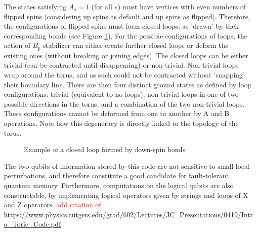 The states satisfying $A_s=1$ (for all $s$) must have vertices with even numbers of flipped spins (considering up spins as default and up spins as flipped). Therefore, the configurations of flipped spins must form closed loops, as 'drawn' by their corresponding bonds (see Figure \ref{fig:toric_code_loop}). For the possible configurations of loops, the action of $B_p$ stabilizer can either create further closed loops or deform the existing ones (without breaking or joining edges). The closed loops can be either trivial (can be contracted until disappearing) or non-trivial. Non-trivial loops wrap around the torus, and as such could not be contracted without 'snapping' their boundary line. There are then four distinct ground states as defined by loop configurations: trivial (equivalent to no loops), non-trivial loops in one of two possible directions in the torus, and a combination of the two non-trivial loops. These configurations cannot be deformed from one to another by A and B operations. Note how this degeneracy is directly linked to the topology of the torus.

\begin{figure}
    \centering

    \caption{Example of a closed loop formed by down-spin bonds}
    \label{fig:toric_code_loop}
\end{figure}

The two qubits of information stored by this code are not sensitive to small local perturbations, and therefore constitute a good candidate for fault-tolerant quantum memory. Furthermore, computations on the logical qubits are also constructable, by implementing logical operators given by strings and loops of X and Z operators. \textcolor{red}{add citation of \url{https://www.physics.rutgers.edu/grad/602/Lectures/JC_Presentations/0419/Intro_Toric_Code.pdf}}

